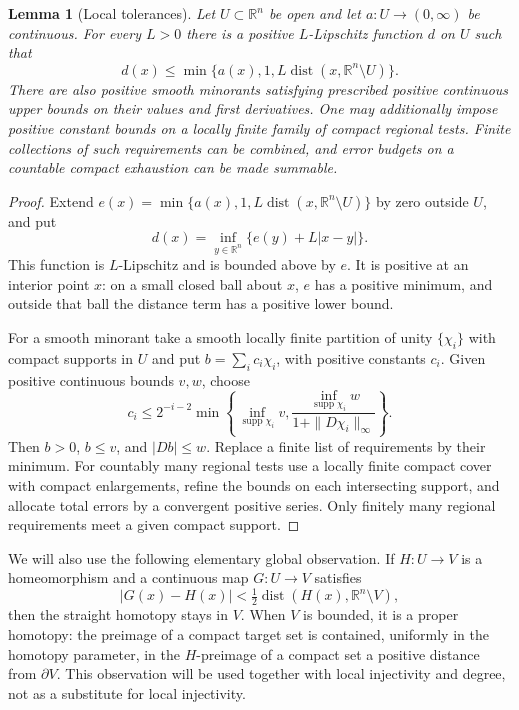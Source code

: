 \documentclass[11pt]{article}
\numberwithin{equation}{section}
\newtheorem{lemma}[theorem]{Lemma}
\theoremstyle{definition}
\theoremstyle{remark}
\newcommand{\R}{\mathbb R}
\DeclareMathOperator{\supp}{supp}
\DeclareMathOperator{\dist}{dist}
\begin{document}
\begin{lemma}[Local tolerances]\label{pre:local-tolerances}
Let $U\subset\R^n$ be open and let $a:U\to(0,\infty)$ be continuous. For every $L>0$ there is a positive $L$-Lipschitz function $d$ on $U$ such that
\[
 d(x)\le \min\{a(x),1,L\dist(x,\R^n\setminus U)\}.
\]
There are also positive smooth minorants satisfying prescribed positive continuous upper bounds on their values and first derivatives. One may additionally impose positive constant bounds on a locally finite family of compact regional tests. Finite collections of such requirements can be combined, and error budgets on a countable compact exhaustion can be made summable.
\end{lemma}
\begin{proof}
Extend $e(x)=\min\{a(x),1,L\dist(x,\R^n\setminus U)\}$ by zero outside $U$, and put
\[
 d(x)=\inf_{y\in\R^n}\{e(y)+L|x-y|\}.
\]
This function is $L$-Lipschitz and is bounded above by $e$. It is positive at an interior point $x$: on a small closed ball about $x$, $e$ has a positive minimum, and outside that ball the distance term has a positive lower bound.

For a smooth minorant take a smooth locally finite partition of unity $\{\chi_i\}$ with compact supports in $U$ and put $b=\sum_i c_i\chi_i$, with positive constants $c_i$. Given positive continuous bounds $v,w$, choose
\[
 c_i\le 2^{-i-2}\min\left\{
 \inf_{\supp\chi_i}v,
 \frac{\inf_{\supp\chi_i}w}{1+\|D\chi_i\|_\infty}
 \right\}.
\]
Then $b>0$, $b\le v$, and $|Db|\le w$. Replace a finite list of requirements by their minimum. For countably many regional tests use a locally finite compact cover with compact enlargements, refine the bounds on each intersecting support, and allocate total errors by a convergent positive series. Only finitely many regional requirements meet a given compact support.
\end{proof}

We will also use the following elementary global observation. If $H:U\to V$ is a homeomorphism and a continuous map $G:U\to V$ satisfies
\[
 |G(x)-H(x)|<\tfrac12\dist(H(x),\R^n\setminus V),
\]
then the straight homotopy stays in $V$. When $V$ is bounded, it is a proper homotopy: the preimage of a compact target set is contained, uniformly in the homotopy parameter, in the $H$-preimage of a compact set a positive distance from $\partial V$. This observation will be used together with local injectivity and degree, not as a substitute for local injectivity.

\tableofcontents
\end{document}
